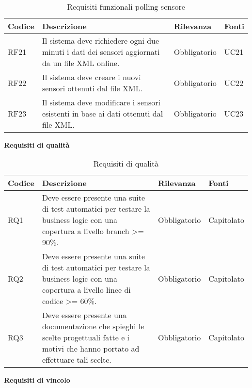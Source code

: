 \begin{table}[H]
    \begin{tabular}{|p{1cm}|p{6cm}|p{1.9cm}|p{1.8cm}|} 
    \hline
    Codice & Descrizione & Rilevanza &  Fonti \\ 
    \hline
    RF21 & Il sistema deve richiedere ogni due minuti i dati dei sensori aggiornati da un file \gls{XML} online. & Obbligatorio & UC21 \\ 
    \hline
    RF22 & Il sistema deve creare i nuovi sensori ottenuti dal file \gls{XML}. & Obbligatorio & UC22 \\ 
    \hline
    RF23 & Il sistema deve modificare i sensori esistenti in base ai dati ottenuti dal file \gls{XML}. & Obbligatorio & UC23 \\ 
    \hline
    \end{tabular}
    \caption{Requisiti funzionali polling sensore}
\end{table}
\leavevmode\newline
\textbf{Requisiti di qualità}

\begin{table}[H]
    \begin{tabular}{|p{1cm}|p{6cm}|p{1.9cm}|p{1.8cm}|} 
    \hline
    Codice & Descrizione & Rilevanza &  Fonti \\ 
    \hline
    RQ1 & Deve essere presente una suite di test automatici per testare la business logic con una copertura a livello branch
        >= 90\%. & Obbligatorio & Capitolato \\ 
    \hline
    RQ2 & Deve essere presente una suite di test automatici per testare la business logic con una copertura a livello linee
        di codice >= 60\%. & Obbligatorio & Capitolato \\ 
    \hline
    RQ3 & Deve essere presente una documentazione che spieghi le scelte progettuali fatte e i motivi che hanno portato ad effettuare
        tali scelte. & Obbligatorio & Capitolato \\ 
    \hline
    \end{tabular}
    \caption{Requisiti di qualità}
\end{table}
\clearpage
\leavevmode\newline
\textbf{Requisiti di vincolo}

